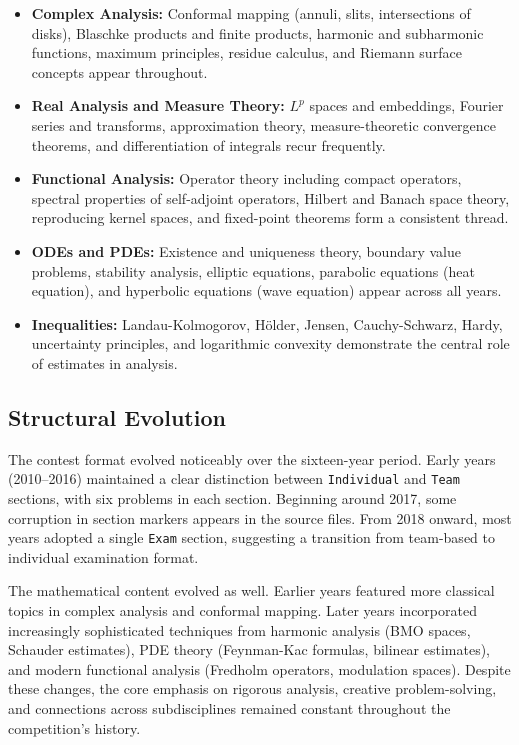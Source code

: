 \begin{itemize}
\item \textbf{Complex Analysis:} Conformal mapping (annuli, slits, intersections of disks), Blaschke products and finite products, harmonic and subharmonic functions, maximum principles, residue calculus, and Riemann surface concepts appear throughout.

\item \textbf{Real Analysis and Measure Theory:} $L^p$ spaces and embeddings, Fourier series and transforms, approximation theory, measure-theoretic convergence theorems, and differentiation of integrals recur frequently.

\item \textbf{Functional Analysis:} Operator theory including compact operators, spectral properties of self-adjoint operators, Hilbert and Banach space theory, reproducing kernel spaces, and fixed-point theorems form a consistent thread.

\item \textbf{ODEs and PDEs:} Existence and uniqueness theory, boundary value problems, stability analysis, elliptic equations, parabolic equations (heat equation), and hyperbolic equations (wave equation) appear across all years.

\item \textbf{Inequalities:} Landau-Kolmogorov, H\"older, Jensen, Cauchy-Schwarz, Hardy, uncertainty principles, and logarithmic convexity demonstrate the central role of estimates in analysis.
\end{itemize}

\subsection{Structural Evolution}

The contest format evolved noticeably over the sixteen-year period. Early years (2010--2016) maintained a clear distinction between \texttt{Individual} and \texttt{Team} sections, with six problems in each section. Beginning around 2017, some corruption in section markers appears in the source files. From 2018 onward, most years adopted a single \texttt{Exam} section, suggesting a transition from team-based to individual examination format.

The mathematical content evolved as well. Earlier years featured more classical topics in complex analysis and conformal mapping. Later years incorporated increasingly sophisticated techniques from harmonic analysis (BMO spaces, Schauder estimates), PDE theory (Feynman-Kac formulas, bilinear estimates), and modern functional analysis (Fredholm operators, modulation spaces). Despite these changes, the core emphasis on rigorous analysis, creative problem-solving, and connections across subdisciplines remained constant throughout the competition's history.

